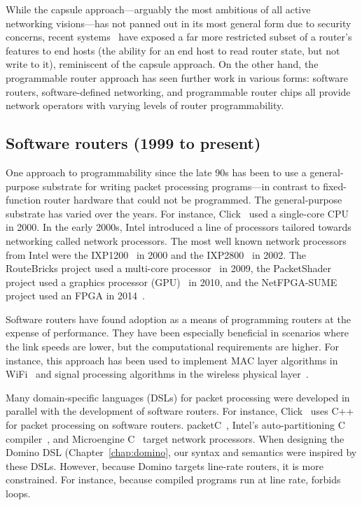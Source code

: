 While the capsule approach---arguably the most ambitious of all active
networking visions---has not panned out in its most general form due to
security concerns, recent systems~\cite{int} have exposed a far more restricted
subset of a router's features to end hosts (\eg the ability for an end host to
read router state, but not write to it), reminiscent of the capsule approach.
On the other hand, the programmable router approach has seen further work in
various forms: software routers, software-defined networking, and programmable
router chips all provide network operators with varying levels of router
programmability.

\subsection{Software routers (1999 to present)}
One approach to programmability since the late 90s has been to use a
general-purpose substrate for writing packet processing programs---in contrast
to fixed-function router hardware that could not be programmed. The
general-purpose substrate has varied over the years. For instance,
Click~\cite{click} used a single-core CPU in 2000.  In the early 2000s, Intel
introduced a line of processors tailored towards networking called network
processors. The most well known network processors from Intel were the
IXP1200~\cite{ixp1200} in 2000 and the IXP2800~\cite{ixp2800} in 2002.  The RouteBricks
project used a multi-core processor~\cite{routebricks} in 2009, the
PacketShader project used a graphics processor (GPU)~\cite{packetshader} in
2010, and the NetFPGA-SUME project used an FPGA in 2014~\cite{netfpga}.

Software routers have found adoption as a means of programming routers at the
expense of performance. They have been especially beneficial in scenarios where
the link speeds are lower, but the computational requirements are higher.  For
instance, this approach has been used to implement MAC layer
algorithms in WiFi~\cite{samplerate, roofnet, xor} and signal processing
algorithms in the wireless physical layer~\cite{sora, cloudiq}.

Many domain-specific languages (DSLs) for packet processing were developed in
parallel with the development of software routers. For instance,
Click~\cite{click} uses C++ for packet processing on software routers.
packetC~\cite{packetc}, Intel's auto-partitioning C
compiler~\cite{intel_uiuc_pldi}, and Microengine C~\cite{microenginec} target
network processors. When designing the Domino DSL (Chapter~\ref{chap:domino},
our syntax and semantics were inspired by these DSLs.  However, because Domino
targets line-rate routers, it is more constrained. For instance, because
compiled programs run at line rate, \pktlanguage forbids loops.

